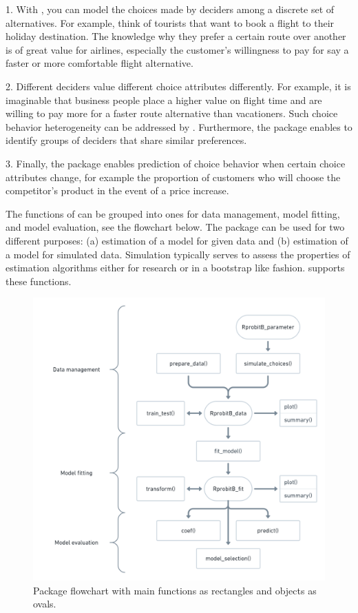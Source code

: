\documentclass[article]{jss}
\begin{document}
1. With , you can model the choices made by deciders among a discrete set of alternatives. For example, think of tourists that want to book a flight to their holiday destination. The knowledge why they prefer a certain route over another is of great value for airlines, especially the customer's willingness to pay for say a faster or more comfortable flight alternative.

2. Different deciders value different choice attributes differently. For example, it is imaginable that business people place a higher value on flight time and are willing to pay more for a faster route alternative than vacationers. Such choice behavior heterogeneity can be addressed by . Furthermore, the package enables to identify groups of deciders that share similar preferences.

3. Finally, the package enables prediction of choice behavior when certain choice attributes change, for example the proportion of customers who will choose the competitor's product in the event of a price increase.

The functions of  can be grouped into ones for data management, model fitting, and model evaluation, see the flowchart below. The package can be used for two different purposes: (a) estimation of a model for given data and (b) estimation of a model for simulated data. Simulation typically serves to assess the properties of estimation algorithms either for research or in a bootstrap like fashion.  supports these functions.

\begin{figure}[t!]
  \includegraphics{flowchart.png}
  \caption{Package flowchart with main functions as rectangles and objects as ovals.}
  \label{fig:flowchart}
\end{figure}
\end{document}
